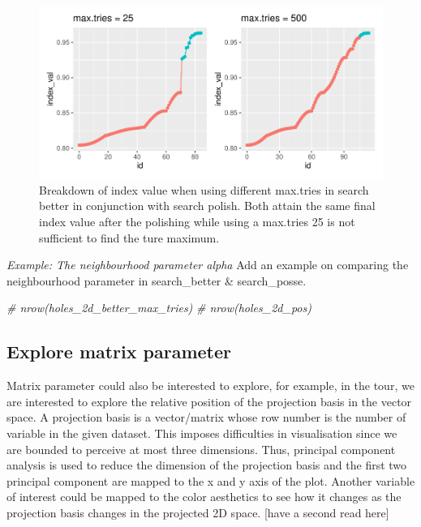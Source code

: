 \documentclass[12pt]{article}
\newenvironment{Shaded}{\begin{snugshade}}{\end{snugshade}}
\newcommand{\CommentTok}[1]{\textcolor[rgb]{0.56,0.35,0.01}{\textit{#1}}}
\begin{document}
\begin{figure}
\centering
\includegraphics{paper_files/figure-latex/polish-1.pdf}
\caption{\label{trace-compare}Breakdown of index value when using
different max.tries in search better in conjunction with search polish.
Both attain the same final index value after the polishing while using a
max.tries 25 is not sufficient to find the ture maximum.}
\end{figure}

\emph{Example: The neighbourhood parameter alpha} Add an example on
comparing the neighbourhood parameter in search\_better \&
search\_posse.

\begin{Shaded}
\begin{Highlighting}[]
\CommentTok{# nrow(holes_2d_better_max_tries)}
\CommentTok{# nrow(holes_2d_pos)}
\end{Highlighting}
\end{Shaded}

\hypertarget{explore-matrix-parameter}{%
\subsection{Explore matrix parameter}\label{explore-matrix-parameter}}

Matrix parameter could also be interested to explore, for example, in
the tour, we are interested to explore the relative position of the
projection basis in the vector space. A projection basis is a
vector/matrix whose row number is the number of variable in the given
dataset. This imposes difficulties in visualisation since we are bounded
to perceive at most three dimensions. Thus, principal component analysis
is used to reduce the dimension of the projection basis and the first
two principal component are mapped to the x and y axis of the plot.
Another variable of interest could be mapped to the color aesthetics to
see how it changes as the projection basis changes in the projected 2D
space. {[}have a second read here{]}
\end{document}
